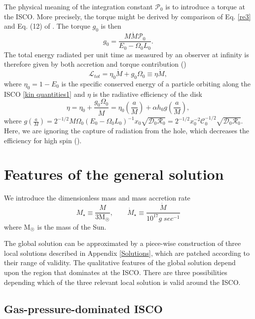 \documentclass[a4paper,fleqn,usenatbib]{mnrasMOD}
\numberwithin{equation}{section}
\newcommand{\be}{\begin{equation}}
\newcommand{\ee}{\end{equation}}
\begin{document}
The physical meaning of the integration constant $\mathcal{P}_{0}$ is to introduce a torque at the ISCO. More precisely, the torque might be derived by comparison of Eq. \eqref{re3} and Eq. (12) of \cite{2002ApJ...567..463L}. The torque $g_{0}$ is then
\be \label{torque}
g_{0} = \frac{M \dot{M} \mathcal{P}_{0}}{E_{0} - \Omega_{0}L_{0}}.
\ee
The total energy radiated per unit time as measured by an observer at infinity is therefore given by both accretion and torque contribution (\cite{2002ApJ...567..463L})
\be
\mathcal{L}_{tot} =  \eta_{0} \dot{M} + g_{0} \Omega_{0} \equiv \eta \dot{M},
\ee
where $\eta_{0}  = 1 - E_{0} $ is the specific conserved energy of a particle orbiting along the ISCO \eqref{kin quantities1} and $\eta$ is the radiative efficiency of the disk 
\be \label{radiative efficiency}
\eta = \eta_{0} + \frac{g_{0}\Omega_{0}}{\dot{M}} = \eta_0\left(\frac{a}{M}\right) + \alpha h_0 g\left(\frac{a}{M}\right),
\ee
where $g\left(\frac{a}{M}\right)=2^{-1/2}M\Omega_0 (E_{0} - \Omega_{0}L_{0})^{-1}x_0 \sqrt{\mathcal D_0 \mathcal R_0} = 2^{-1/2}x_{0}^{-2}\mathcal{C}_{0}^{-1/2}\sqrt{\mathcal{D}_0 \mathcal{R}_0}$. Here, we are ignoring the capture of radiation from the hole, which decreases the efficiency for high spin (\cite{1974ApJ...191..507T}). 




\section{Features of the general solution} \label{sec:features}

We introduce the dimensionless mass and mass accretion rate
\be
M_{\star} \equiv \frac{M}{3 \mbox{M}_{\astrosun}}, \qquad \dot{M}_\star \equiv \frac{\dot{M}}{10^{17} g\; sec^{-1}}
\ee 
where M$_{\astrosun}$ is the mass of the Sun. 

The global solution can be approximated by a piece-wise construction of three local solutions described in Appendix \ref{Solutions}, which are patched according to their range of validity. The qualitative features of the global solution depend upon the region that dominates at the ISCO. There are three possibilities depending which of the three relevant local solution is valid around the ISCO. 

\subsection{Gas-pressure-dominated ISCO}
\end{document}

